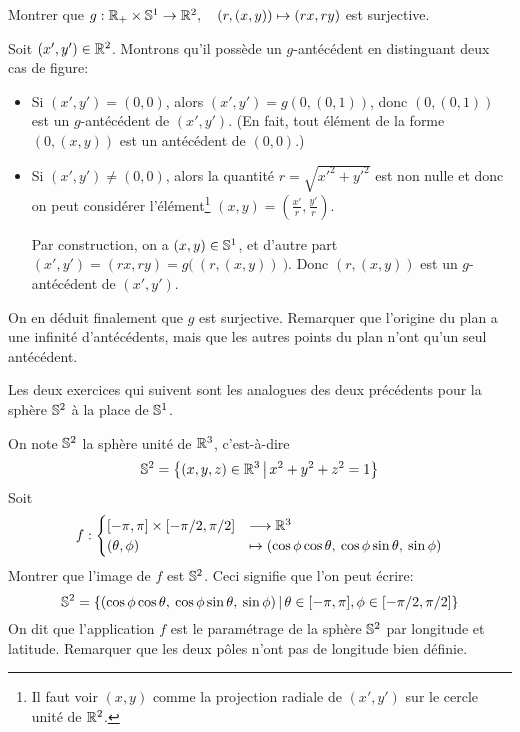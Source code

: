 \begin{exercice}\label{exo-decomp-polaire}
Montrer que $g : \R_+\times \S^1 \to \R^2, \quad (r,(x,y))\mapsto (rx,ry)$ est surjective.
\end{exercice}
\begin{red}
Soit $(x',y')\in \R^2$. Montrons qu'il possède un $g$-antécédent en distinguant deux cas de figure:
\begin{itemize}
\item Si $(x',y')=(0,0)$, alors $(x',y')=g(0,(0,1))$, donc $(0,(0,1))$ est un $g$-antécédent de $(x',y')$. (En fait, tout élément de la forme $(0,(x,y))$ est un antécédent de $(0,0)$.)
\item Si $(x',y')\neq (0,0)$, alors la quantité $r=\sqrt{x'^2+y'^2}$ est non nulle et donc on peut considérer l'élément\footnote{Il faut  voir $(x,y)$ comme la projection radiale de $(x',y')$ sur le cercle unité de $\R^2$.} $(x,y)=\left(\frac{x'}{r},\frac{y'}{r}\right)$.

Par construction, on a $(x,y)\in \S^1$, et d'autre part $(x',y')=(rx,ry)=g\big(\:(r,(x,y))\:\big)$. Donc $(r,(x,y))$ est un $g$-antécédent de $(x',y')$. 
\end{itemize}
On en déduit finalement que $g$ est surjective. Remarquer que l'origine du plan a une infinité d'antécédents, mais que les autres points du plan n'ont qu'un seul antécédent.
\end{red}

Les deux exercices qui suivent sont les analogues des deux précédents pour la sphère $\S^2$ à la place de $\S^1$.

\begin{exercice}\label{exo-coord-spheriques-sphere}
On note $\S^2$ la sphère unité de $\R^3$, c'est-à-dire 
\[ \S^2 = \ensemble{(x,y,z)\in\R^3}{x^2+y^2+z^2=1}\]
Soit 
\[ f : 
\begin{cases}
 [-\pi,\pi] \times [-\pi/2,\pi/2] &\longrightarrow \R^3\\
(\theta,\phi) &\mapsto (\cos\phi\cos\theta,\: \cos\phi\sin\theta, \: \sin\phi)
\end{cases}
\]
Montrer que l'image de $f$ est $\S^2$. Ceci signifie que l'on peut écrire:
\[ \S^2 = \ensemble{(\cos\phi\cos\theta,\: \cos\phi\sin\theta, \: \sin\phi)}{\theta\in [-\pi,\pi], \phi\in [-\pi/2,\pi/2]}
\]
On dit que l'application $f$ est le paramétrage de la sphère $\S^2$ par longitude et latitude. Remarquer que les deux pôles n'ont pas de longitude bien définie.
\end{exercice}

